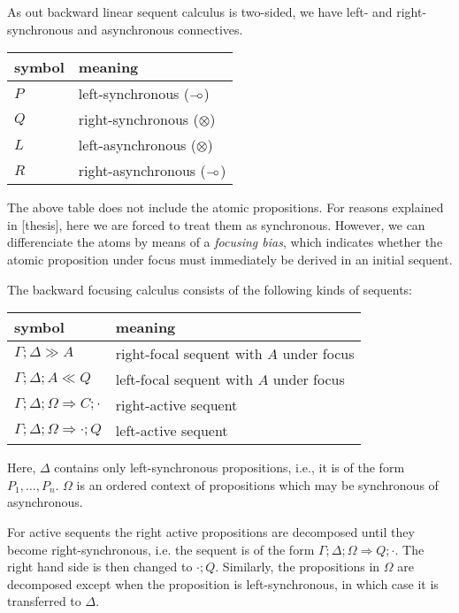 \documentclass{article}
\def\limp {\mathbin{{-}\mkern-3.5mu{\circ}}}
\begin{document}
As out backward linear sequent calculus is two-sided, we have left- and right-
synchronous and asynchronous connectives.

\begin{table}[h]
  \centering
  \begin{tabular}{|l|l|}
    \hline
    \textbf{symbol} & \textbf{meaning} \\
    \hline
    $P$ & left-synchronous ($\limp$) \\
    $Q$ & right-synchronous ($\otimes$) \\
    $L$ & left-asynchronous ($\otimes$) \\
    $R$ & right-asynchronous ($\limp$) \\
    \hline
  \end{tabular}
\end{table}

The above table does not include the atomic propositions. For reasons explained
in [thesis], here we are forced to treat them as synchronous. However, we can
differenciate the atoms by means of a \emph{focusing bias}, which indicates
whether the atomic proposition under focus must immediately be derived in an
initial sequent.

The backward focusing calculus consists of the following kinds of sequents:

\begin{table}[h]
  \centering
  \begin{tabular}{|l|l|}
    \hline
    \textbf{symbol} & \textbf{meaning} \\
    \hline
    $\Gamma; \Delta \gg A$ & right-focal sequent with $A$ under focus \\
    $\Gamma; \Delta; A \ll Q$ & left-focal sequent with $A$ under focus \\
    $\Gamma; \Delta; \Omega \Longrightarrow C; \cdot$ & right-active sequent \\
    $\Gamma; \Delta; \Omega \Longrightarrow \cdot; Q$ & left-active sequent \\
    \hline
  \end{tabular}
\end{table}

Here, $\Delta$ contains only left-synchronous propositions, i.e., it is of the
form $P_1, \dots, P_n$. $\Omega$ is an ordered context of propositions which may
be synchronous of asynchronous.

For active sequents the right active propositions are decomposed until they
become right-synchronous, i.e. the sequent is of the form $\Gamma; \Delta;
\Omega \Longrightarrow Q; \cdot$. The right hand side is then changed to $\cdot;
Q$. Similarly, the propositions in $\Omega$ are decomposed except when the
proposition is left-synchronous, in which case it is transferred to $\Delta$.
\end{document}
